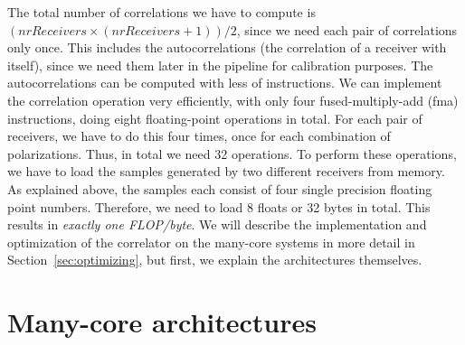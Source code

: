 \documentclass{article}
\begin{document}
The total number of correlations we have to compute is $(nrReceivers \times
(nrReceivers + 1)) / 2$, since we need each pair of correlations only
once. This includes the autocorrelations (the correlation of a receiver with itself),
since we need them later in the pipeline for calibration purposes.
The autocorrelations can be computed with less of instructions.
We can implement the correlation operation very efficiently, with only
four fused-multiply-add (fma) instructions, doing eight floating-point
operations in total. For each pair of receivers, we have to do this
four times, once for each combination of polarizations. Thus, in total
we need 32 operations. To perform these operations, we have to load
the samples generated by two different receivers from memory.  As
explained above, the samples each consist of four single precision
floating point numbers.  Therefore, we need to load 8 floats or 32 bytes in
total.  This results in \emph{exactly one FLOP/byte}. 
We will describe the implementation and optimization of the correlator on the
many-core systems in more detail in Section~\ref{sec:optimizing}, but first, we explain the architectures themselves. 


\section{Many-core architectures}
\end{document}
